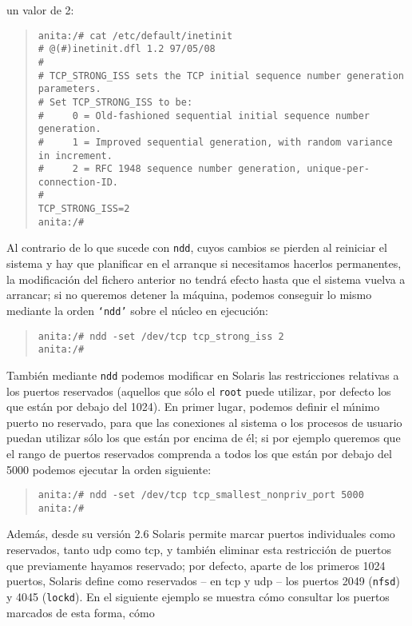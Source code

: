 un valor de 2:
\begin{quote}
\begin{verbatim}
anita:/# cat /etc/default/inetinit
# @(#)inetinit.dfl 1.2 97/05/08
#
# TCP_STRONG_ISS sets the TCP initial sequence number generation parameters.
# Set TCP_STRONG_ISS to be:
#     0 = Old-fashioned sequential initial sequence number generation.
#     1 = Improved sequential generation, with random variance in increment.
#     2 = RFC 1948 sequence number generation, unique-per-connection-ID.
#
TCP_STRONG_ISS=2
anita:/#
\end{verbatim}
\end{quote}
Al contrario de lo que sucede con {\tt ndd}, cuyos cambios se pierden al 
reiniciar el sistema y hay que planificar en el arranque si necesitamos hacerlos
permanentes, la modificaci\'on del fichero anterior no tendr\'a efecto hasta 
que el sistema vuelva a arrancar; si no queremos detener la m\'aquina, podemos 
conseguir lo mismo mediante la orden {\tt `ndd'} sobre el n\'ucleo en 
ejecuci\'on:
\begin{quote}
\begin{verbatim}
anita:/# ndd -set /dev/tcp tcp_strong_iss 2
anita:/# 
\end{verbatim}
\end{quote}
Tambi\'en mediante {\tt ndd} podemos modificar en Solaris las restricciones 
relativas a los puertos reservados (aquellos que s\'olo el {\tt root} puede 
utilizar, por defecto los que est\'an por debajo del 1024). En primer lugar,
podemos definir el m\'{\i}nimo puerto no reservado, para que las conexiones al
sistema o los procesos de usuario puedan utilizar s\'olo los que est\'an por
encima de \'el; si por ejemplo queremos que el rango de puertos reservados 
comprenda a todos los que est\'an por debajo del 5000 podemos ejecutar la orden
siguiente:
\begin{quote}
\begin{verbatim}
anita:/# ndd -set /dev/tcp tcp_smallest_nonpriv_port 5000
anita:/#
\end{verbatim}
\end{quote}
Adem\'as, desde su versi\'on 2.6 Solaris permite marcar puertos individuales
como reservados, tanto {\sc udp} como {\sc tcp}, y tambi\'en eliminar esta 
restricci\'on de puertos que previamente hayamos reservado; por defecto, aparte
de los primeros 1024 puertos, Solaris define como reservados -- en {\sc tcp} y
{\sc udp} -- los puertos 2049 ({\tt nfsd}) y 4045 ({\tt lockd}). En el siguiente
ejemplo se muestra c\'omo consultar los puertos marcados de esta forma, c\'omo 
